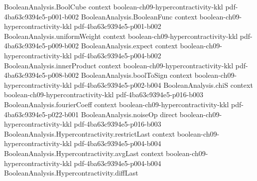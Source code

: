 \begin{theorem}
\leanok
{}
\label{BooleanAnalysis.Hypercontractivity.hypercontractivity_2_4}
\proofstep
  {BooleanAnalysis.BoolCube}
  {context}
  {boolean-ch09-hypercontractivity-kkl}
  {pdf-4ba63c9394e5-p001-b002}
\proofstep
  {BooleanAnalysis.BooleanFunc}
  {context}
  {boolean-ch09-hypercontractivity-kkl}
  {pdf-4ba63c9394e5-p001-b002}
\proofstep
  {BooleanAnalysis.uniformWeight}
  {context}
  {boolean-ch09-hypercontractivity-kkl}
  {pdf-4ba63c9394e5-p009-b002}
\proofstep
  {BooleanAnalysis.expect}
  {context}
  {boolean-ch09-hypercontractivity-kkl}
  {pdf-4ba63c9394e5-p004-b002}
\proofstep
  {BooleanAnalysis.innerProduct}
  {context}
  {boolean-ch09-hypercontractivity-kkl}
  {pdf-4ba63c9394e5-p008-b002}
\proofstep
  {BooleanAnalysis.boolToSign}
  {context}
  {boolean-ch09-hypercontractivity-kkl}
  {pdf-4ba63c9394e5-p002-b004}
\proofstep
  {BooleanAnalysis.chiS}
  {context}
  {boolean-ch09-hypercontractivity-kkl}
  {pdf-4ba63c9394e5-p016-b003}
\proofstep
  {BooleanAnalysis.fourierCoeff}
  {context}
  {boolean-ch09-hypercontractivity-kkl}
  {pdf-4ba63c9394e5-p022-b001}
\proofstep
  {BooleanAnalysis.noiseOp}
  {direct}
  {boolean-ch09-hypercontractivity-kkl}
  {pdf-4ba63c9394e5-p016-b003}
\proofstep
  {BooleanAnalysis.Hypercontractivity.restrictLast}
  {context}
  {boolean-ch09-hypercontractivity-kkl}
  {pdf-4ba63c9394e5-p004-b004}
\proofstep
  {BooleanAnalysis.Hypercontractivity.avgLast}
  {context}
  {boolean-ch09-hypercontractivity-kkl}
  {pdf-4ba63c9394e5-p004-b004}
\proofstep
  {BooleanAnalysis.Hypercontractivity.diffLast}

\end{theorem}
